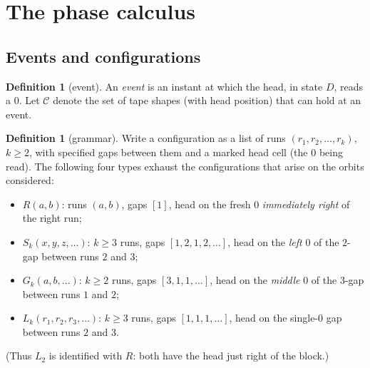 \documentclass[11pt]{amsart}
\theoremstyle{definition}
\newtheorem{definition}[theorem]{Definition}
\begin{document}
\section{The phase calculus}\label{s:phase}

\subsection{Events and configurations}

\begin{definition}[event]
An \emph{event} is an instant at which the head, in state $D$, reads a $0$.
Let $\mathcal{C}$ denote the set of tape shapes (with head position) that
can hold at an event.
\end{definition}

\begin{definition}[grammar]\label{def:grammar}
Write a configuration as a list of runs $(r_1,r_2,\dots,r_k)$,
$k\ge2$, with specified gaps between them and a marked head cell (the $0$
being read). The following four types exhaust the configurations that arise
on the orbits considered:
\begin{itemize}
\item $R(a,b)$: runs $(a,b)$, gaps $[1]$, head on the fresh $0$
\emph{immediately right} of the right run;
\item $S_k(x,y,z,\dots)$: $k\ge3$ runs, gaps $[1,2,1,2,\dots]$, head on the
\emph{left} $0$ of the $2$-gap between runs $2$ and $3$;
\item $G_k(a,b,\dots)$: $k\ge2$ runs, gaps $[3,1,1,\dots]$, head on the
\emph{middle} $0$ of the $3$-gap between runs $1$ and $2$;
\item $L_k(r_1,r_2,r_3,\dots)$: $k\ge3$ runs, gaps $[1,1,1,\dots]$, head on
the single-$0$ gap between runs $2$ and $3$.
\end{itemize}
(Thus $L_2$ is identified with $R$: both have the head just right of the
block.)
\end{definition}
\end{document}
